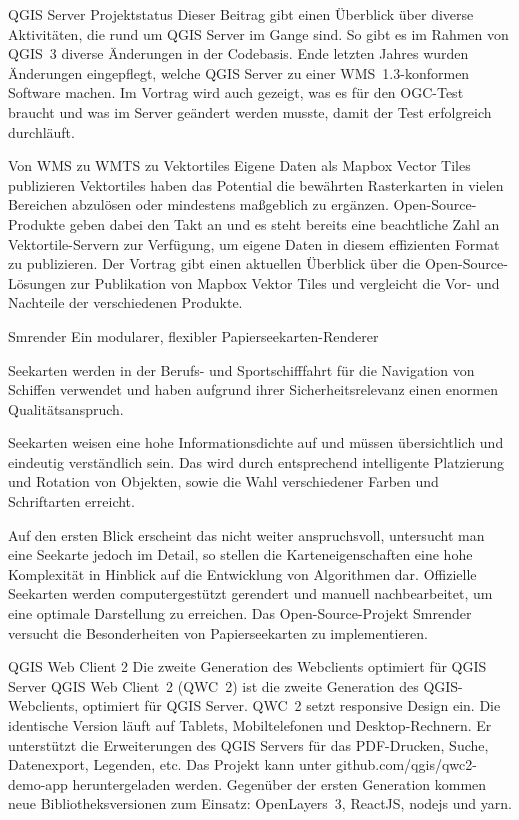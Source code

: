 %
{QGIS Server Projektstatus}%
{}%
{Dieser Beitrag gibt einen Überblick über diverse Aktivitäten, die rund um QGIS
Server im Gange sind. So gibt es im Rahmen von QGIS~3 diverse Änderungen in der
Codebasis. Ende letzten Jahres wurden Änderungen eingepflegt, welche QGIS
Server zu einer WMS~1.3-konformen Software machen. Im Vortrag wird auch
gezeigt, was es für den OGC-Test braucht und was im Server geändert werden
musste, damit der Test erfolgreich durchläuft.}

%
{Von WMS zu WMTS zu Vektortiles}%
{Eigene Daten als Mapbox Vector Tiles publizieren}%
{Vektortiles haben das Potential die bewährten
Rasterkarten in vielen Bereichen abzulösen oder mindestens maßgeblich zu ergänzen.
Open-Source-Produkte geben dabei den Takt an und es steht bereits eine beachtliche Zahl an
Vektortile-Servern zur Verfügung, um eigene Daten in diesem effizienten Format zu publizieren. Der
Vortrag gibt einen aktuellen Überblick über die Open-Source-Lösungen zur Publikation von Mapbox
Vektor Tiles und vergleicht die Vor- und Nachteile der verschiedenen Produkte. }

%
{Smrender}%
{Ein modularer, flexibler Papierseekarten-Renderer}%
{Seekarten werden in der Berufs- und Sportschifffahrt für die Navigation von
Schiffen verwendet und haben aufgrund ihrer Sicherheitsrelevanz einen enormen
Qualitätsanspruch.

Seekarten weisen eine hohe Informationsdichte auf und müssen übersichtlich und
eindeutig verständlich sein. Das wird durch entsprechend intelligente
Platzierung und Rotation von Objekten, sowie die Wahl verschiedener Farben und
Schriftarten erreicht.

Auf den ersten Blick erscheint das nicht weiter anspruchsvoll, untersucht man
eine Seekarte jedoch im Detail, so stellen die Karteneigenschaften eine hohe
Komplexität in Hinblick auf die Entwicklung von Algorithmen dar.
Offizielle Seekarten werden computergestützt gerendert und manuell
nachbearbeitet, um eine optimale Darstellung zu erreichen.
Das Open-Source-Projekt Smrender versucht die Besonderheiten von Papierseekarten
zu implementieren.}

%
{QGIS Web Client 2}%
{Die zweite Generation des Webclients optimiert für QGIS Server}%
{QGIS Web Client~2 (QWC~2) ist die zweite Generation des QGIS-Webclients,
optimiert für QGIS Server. QWC~2 setzt responsive Design ein. Die
identische Version läuft auf Tablets, Mobiltelefonen und
Desktop-Rechnern. Er unterstützt die Erweiterungen des QGIS Servers für
das PDF-Drucken, Suche, Datenexport, Legenden, etc. Das Projekt kann
unter github.com/qgis/qwc2-demo-app heruntergeladen werden.
Gegenüber der ersten Generation kommen neue Bibliotheksversionen zum
Einsatz: OpenLayers~3, ReactJS, nodejs und yarn.}

